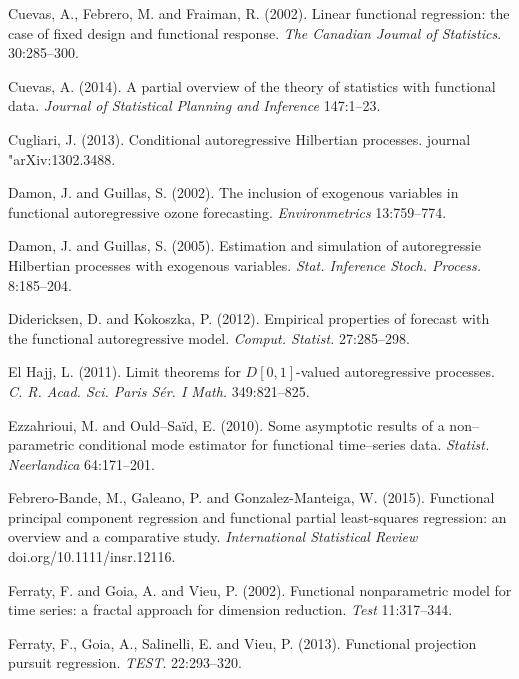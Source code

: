 \documentclass[11pt,a4paper]{article}
\begin{document}
\begin{thebibliography}{9}
Cuevas, A., Febrero, M. and Fraiman, R. (2002). Linear functional regression: the case of fixed design and functional response. \emph{The Canadian Joumal of Statistics}. 30:285--300.

Cuevas, A. (2014). A partial overview of the theory of statistics with functional data. \emph{Journal of Statistical Planning and Inference} 147:1--23.

Cugliari,  J. (2013).
	Conditional autoregressive {H}ilbertian processes.
	journal "arXiv:1302.3488.


 Damon, J. and  Guillas, S. (2002).
	The inclusion of exogenous variables in functional autoregressive ozone forecasting.
	\emph{Environmetrics} 13:759--774.
	

	 Damon, J. and  Guillas, S. (2005).
	Estimation and simulation of autoregressie Hilbertian processes with exogenous variables.
	\emph{Stat. Inference Stoch. Process.} 8:185--204.


Didericksen, D. and Kokoszka, P. (2012).
	Empirical properties of forecast with the functional autoregressive model.
	\emph{Comput. Statist.} 27:285--298.

 El Hajj, L. (2011).
Limit theorems for {$D[0,1]$}-valued autoregressive processes.
	\emph{C. R. Acad. Sci. Paris S\'er. I Math.}  349:821--825.	

Ezzahrioui, M.  and  Ould--Sa{\"i}d,  E.  (2010).
	Some asymptotic results of a non--parametric conditional mode estimator for functional time--series data.
	\emph{Statist. Neerlandica}  64:171--201.

Febrero-Bande, M.,  Galeano, P. and Gonzalez-Manteiga, W. (2015). Functional principal component regression and functional partial least-squares regression: an overview and a comparative study. \emph{International Statistical Review} doi.org/10.1111/insr.12116.


 Ferraty, F. and  Goia, A. and  Vieu, P.  (2002).
	Functional nonparametric model for time series: a fractal approach for dimension reduction.
	\emph{Test} 11:317--344.


Ferraty, F., Goia, A., Salinelli, E. and Vieu, P. (2013). Functional projection pursuit regression. \emph{TEST}. 22:293--320.\\



\end{thebibliography}
\end{document}
